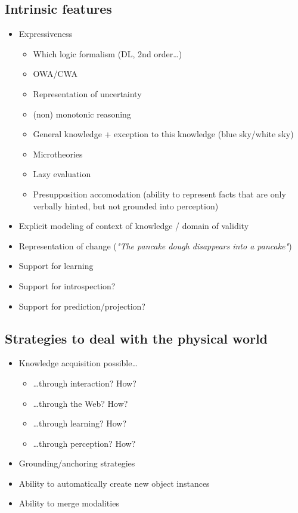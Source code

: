\documentclass[a4paper]{article}
\begin{document}
\subsection{Intrinsic features}
\label{sect|intrinsic-features}

\begin{itemize}
	\item  Expressiveness
	\begin{itemize}
		\item  Which logic formalism (DL, 2nd order\ldots{})
		\item  OWA/CWA
		\item  Representation of uncertainty
		\item  (non) monotonic reasoning
		\item  General knowledge + exception to this knowledge (blue sky/white sky)
		\item  Microtheories
		\item  Lazy evaluation
		\item  Presupposition accomodation (ability to represent facts that are only verbally hinted, but not grounded into perception)
	\end{itemize}

	\item  Explicit modeling of context of knowledge / domain of validity
	\item  Representation of change (\emph{"The pancake dough disappears into a pancake"})
	\item  Support for learning
	\item  Support for introspection?
	\item  Support for prediction/projection?
\end{itemize}

\subsection{Strategies to deal with the physical world}

\begin{itemize}
	\item  Knowledge acquisition possible\ldots{}
	\begin{itemize}
		\item  \ldots{}through interaction? How?
		\item  \ldots{}through the Web? How?
		\item  \ldots{}through learning? How?
		\item  \ldots{}through perception? How?
	\end{itemize}
	\item Grounding/anchoring strategies
	\item Ability to automatically create new object instances
	\item Ability to merge modalities
\end{itemize}
\end{document}
